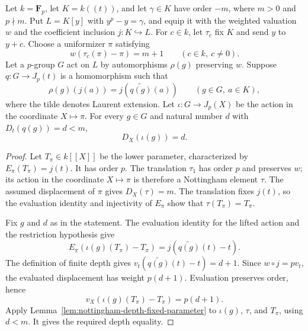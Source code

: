 \begin{lemma}
\label{lem:artin-schreier-depth-of-restriction}
\leanok
Let $k=\mathbf F_p$, let $K=k((t))$, and let $\gamma\in K$
have order $-m$, where $m>0$ and $p\nmid m$.
Put $L=K[y]$ with $y^p-y=\gamma$, and equip it with the weighted
valuation $w$ and the coefficient inclusion $j:K\hookrightarrow L$.
For $c\in k$, let $\tau_c$ fix $K$ and send $y$ to $y+c$.
Choose a uniformizer $\pi$ satisfying
\[
 w(\tau_c(\pi)-\pi)=m+1\qquad(c\in k,\ c\ne0).
\]
Let a $p$-group $G$ act on $L$ by automorphisms $\rho(g)$
preserving $w$. Suppose $q:G\to J_p(t)$ is a homomorphism
such that
\[
 \rho(g)(j(a))=j(\widetilde{q(g)}(a))
 \qquad(g\in G,\ a\in K),
\]
where the tilde denotes Laurent extension.
Let $\iota:G\to J_p(X)$ be the action in the coordinate $X\mapsto\pi$.
For every $g\in G$ and natural number $d$ with $D_t(q(g))=d<m$,
\[
 D_X(\iota(g))=d.
\]
\end{lemma}

\begin{proof}
Let $T_\pi\in k[[X]]$ be the lower parameter, characterized by
$E_\pi(T_\pi)=j(t)$. It has order $p$.
The translation $\tau_1$ has order $p$ and preserves $w$;
its action in the coordinate $X\mapsto\pi$ is therefore a
Nottingham element $\tau$. The assumed displacement of $\pi$
gives $D_X(\tau)=m$. The translation fixes $j(t)$, so the
evaluation identity and injectivity of $E_\pi$ show that
$\tau(T_\pi)=T_\pi$.

Fix $g$ and $d$ as in the statement. The evaluation identity
for the lifted action and the restriction hypothesis give
\[
 E_\pi(\iota(g)(T_\pi)-T_\pi)
   =j(\widetilde{q(g)}(t)-t).
\]
The definition of finite depth gives
$v_t(\widetilde{q(g)}(t)-t)=d+1$. Since $w\circ j=pv_t$,
the evaluated displacement has weight $p(d+1)$.
Evaluation preserves order, hence
\[
 v_X(\iota(g)(T_\pi)-T_\pi)=p(d+1).
\]
Apply Lemma~\ref{lem:nottingham-depth-fixed-parameter} to
$\iota(g)$, $\tau$, and $T_\pi$, using $d<m$. It gives the
required depth equality.
\end{proof}

